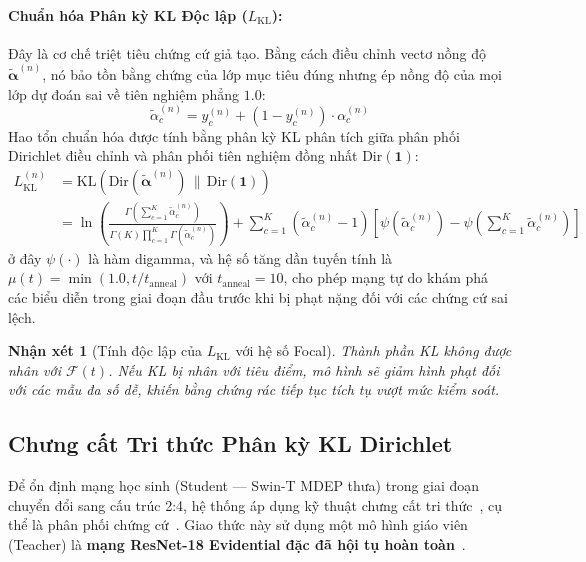 \documentclass[11pt, a4paper]{article}
\newcommand{\Dir}{\text{Dir}}
\newcommand{\KL}{\text{KL}}
\newtheorem{remark}{Nhận xét}
\begin{document}
\paragraph{Chuẩn hóa Phân kỳ KL Độc lập ($L_{\text{KL}}$):}
Đây là cơ chế triệt tiêu chứng cứ giả tạo. Bằng cách điều chỉnh vectơ nồng độ $\tilde{\bm{\alpha}}^{(n)}$, nó bảo tồn bằng chứng của lớp mục tiêu đúng nhưng ép nồng độ của mọi lớp dự đoán sai về tiên nghiệm phẳng $1.0$:
\begin{equation}
    \tilde{\alpha}_c^{(n)} = y_c^{(n)} + (1 - y_c^{(n)}) \cdot \alpha_c^{(n)}
\end{equation}
Hao tổn chuẩn hóa được tính bằng phân kỳ KL phân tích giữa phân phối Dirichlet điều chỉnh và phân phối tiên nghiệm đồng nhất $\Dir(\bm{1})$:
\begin{align}
    L_{\text{KL}}^{(n)} &= \KL\!\left(\Dir(\tilde{\bm{\alpha}}^{(n)}) \,\|\, \Dir(\bm{1})\right) \nonumber \\
    &= \ln \left( \frac{\Gamma\left(\sum_{c=1}^K \tilde{\alpha}_c^{(n)}\right)}{\Gamma(K) \prod_{c=1}^K \Gamma(\tilde{\alpha}_c^{(n)})} \right) + \sum_{c=1}^K (\tilde{\alpha}_c^{(n)} - 1)\left[\psi(\tilde{\alpha}_c^{(n)}) - \psi\!\left(\sum_{c=1}^K \tilde{\alpha}_c^{(n)}\right)\right] \label{eq:kl_loss_n}
\end{align}
ở đây $\psi(\cdot)$ là hàm digamma, và hệ số tăng dần tuyến tính là $\mu(t) = \min(1.0, t / t_{\text{anneal}})$ với $t_{\text{anneal}} = 10$, cho phép mạng tự do khám phá các biểu diễn trong giai đoạn đầu trước khi bị phạt nặng đối với các chứng cứ sai lệch.

\begin{remark}[Tính độc lập của $L_{\text{KL}}$ với hệ số Focal]
Thành phần KL không được nhân với $\mathcal{F}(t)$. Nếu KL bị nhân với tiêu điểm, mô hình sẽ giảm hình phạt đối với các mẫu đa số dễ, khiến bằng chứng rác tiếp tục tích tụ vượt mức kiểm soát.
\end{remark}

\subsection{Chưng cất Tri thức Phân kỳ KL Dirichlet}\label{subsec:distillation}

Để ổn định mạng học sinh (Student --- Swin-T MDEP thưa) trong giai đoạn chuyển đổi sang cấu trúc 2:4, hệ thống áp dụng kỹ thuật chưng cất tri thức~\cite{hinton2015distilling, gou2021knowledge}, cụ thể là phân phối chứng cứ~\cite{malinin2019ensemble}. Giao thức này sử dụng một mô hình giáo viên (Teacher) là \textbf{mạng ResNet-18 Evidential đặc đã hội tụ hoàn toàn}~\cite{he2016deep}.
\end{document}
